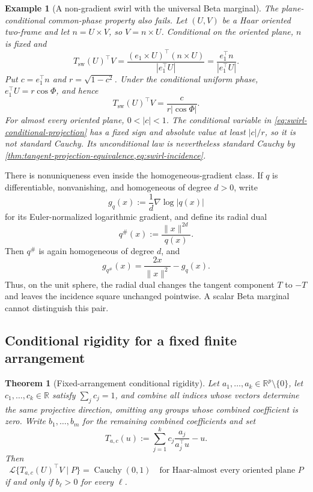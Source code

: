 \documentclass[11pt]{article}
\numberwithin{equation}{section}
\theoremstyle{thmstyleone}%
\newtheorem{theorem}{Theorem}[section]
\theoremstyle{thmstyletwo}%
\newtheorem{example}[example]{Example}
\let\cref\autoref
\newcommand{\R}{\mathbb R}
\newcommand{\Cauchy}{\operatorname{Cauchy}}
\newcommand{\Law}{\mathcal L}
\begin{document}
\begin{example}[A non-gradient swirl with the universal Beta marginal]
The plane-conditional common-phase property also fails.  Let \((U,V)\) be a
Haar oriented two-frame and let \(n=U\times V\), so \(V=n\times U\).
Conditional on the oriented plane, \(n\) is fixed and
\[
  T_{\mathrm{sw}}(U)^\top V
  =
  \frac{(e_1\times U)^\top(n\times U)}
       {|e_1^\top U|}
  =
  \frac{e_1^\top n}{|e_1^\top U|}.
\]
Put \(c=e_1^\top n\) and \(r=\sqrt{1-c^2}\).  Under the conditional uniform
phase, \(e_1^\top U=r\cos\Phi\), and hence
\begin{equation}
  T_{\mathrm{sw}}(U)^\top V
  =
  \frac{c}{r|\cos\Phi|}.
  \label{eq:swirl-conditional-projection}
\end{equation}
For almost every oriented plane, \(0<|c|<1\).  The conditional variable in
\cref{eq:swirl-conditional-projection} has a fixed sign and absolute value
at least \(|c|/r\), so it is not standard Cauchy.  Its unconditional law is
nevertheless standard Cauchy by
\cref{thm:tangent-projection-equivalence,eq:swirl-incidence}.
\end{example}

There is nonuniqueness even inside the homogeneous-gradient class.  If
\(q\) is differentiable, nonvanishing, and homogeneous of degree \(d>0\),
write
\[
  g_q(x):=\frac1d\nabla\log|q(x)|
\]
for its Euler-normalized logarithmic gradient, and
define its radial dual
\begin{equation}
  q^\#(x):=\frac{\|x\|^{2d}}{q(x)}.
  \label{eq:radial-dual}
\end{equation}
Then \(q^\#\) is again homogeneous of degree \(d\), and
\begin{equation}
  g_{q^\#}(x)
  =\frac{2x}{\|x\|^2}-g_q(x).
  \label{eq:radial-dual-gradient}
\end{equation}
Thus, on the unit sphere, the radial dual changes the tangent component
\(T\) to \(-T\) and leaves the incidence square unchanged pointwise.  A
scalar Beta marginal cannot distinguish this pair.

\subsection{Conditional rigidity for a fixed finite arrangement}

\begin{theorem}[Fixed-arrangement conditional rigidity]
\label{thm:fixed-arrangement-rigidity}
Let \(a_1,\ldots,a_k\in\R^p\setminus\{0\}\), let
\(c_1,\ldots,c_k\in\R\) satisfy \(\sum_jc_j=1\), and combine all indices
whose vectors determine the same projective direction, omitting any groups
whose combined coefficient is zero.  Write \(b_1,\ldots,b_m\) for the
remaining combined coefficients and set
\[
  T_{a,c}(u)
  :=
  \sum_{j=1}^k c_j\frac{a_j}{a_j^\top u}-u.
\]
Then
\begin{equation}
  \Law\{T_{a,c}(U)^\top V\mid P\}
  =\Cauchy(0,1)
  \quad\text{for Haar-almost every oriented plane \(P\)}
  \label{eq:fixed-arrangement-conditional}
\end{equation}
if and only if \(b_\ell>0\) for every \(\ell\).
\end{theorem}
\end{document}
